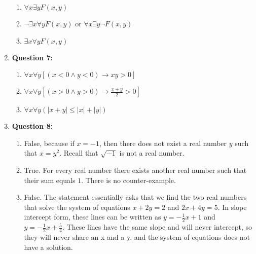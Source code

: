 \documentclass[11pt]{article}
\begin{document}
\begin{enumerate}
\begin{enumerate}[label=(\alph*)]
\item
$\forall x \exists y F(x, y)$

\item
$\lnot \exists x \forall y F(x, y)$ or $\forall x \exists y \lnot F(x, y)$

\item
$\exists x \forall y  F(x, y)$

\end{enumerate}

\item
\textbf{Question 7:}

\begin{enumerate}[label=(\alph*)]
\item
$\forall x \forall y [(x < 0 \land y < 0) \rightarrow xy > 0]$

\item
$\forall x \forall y [(x > 0 \land y > 0) \rightarrow \frac{x + y}{2} > 0]$

\item
$\forall x \forall y (\left| x + y \right| \leq \left| x \right| + \left| y \right|) $

\end{enumerate}

\item
\textbf{Question 8:}

\begin{enumerate}[label=(\alph*)]
\item
False, because if $x=-1$, then there does not exist a real number $y$ such that $x=y^2$. Recall that $\sqrt{-1}$ is not a real number.

\item
True. For every real number there exists another real number such that their sum equals $1$. There is no counter-example. 

\item
False. The statement essentially asks that we find the two real numbers that solve the system of equations $x + 2y = 2$ and $2x +4y = 5$. In slope intercept form, these lines can be written as $y=-\frac{1}{2}x + 1$ and $y=-\frac{1}{2}x + \frac{5}{4}$. These lines have the same slope and will never intercept, so they will never share an x and a y, and the system of equations does not have a solution. 

\end{enumerate}

\end{enumerate}
\end{document}
